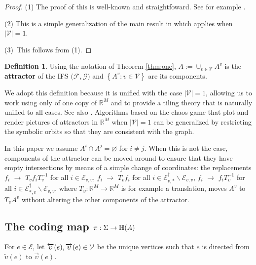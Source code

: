 \documentclass{amsproc}
\theoremstyle{plain}
\theoremstyle{definition}
\newtheorem{definition}{Definition}
\numberwithin{equation}{section}
\begin{document}
\begin{proof}
(1) The proof of this is well-known and straightfoward. See for example \cite%
[Chapter 10]{barnsleyFE2}.

(2) This is a simple generalization of the main result in \cite%
{barnsleychaos} which applies when $\left\vert \mathcal{V}\right\vert =1$.

(3)\ This follows from (1).
\end{proof}

\begin{definition}
Using the notation of Theorem \ref{thm:one}, $A:=\cup_{v\in\mathcal{V}}A^{v}$
is the \textbf{attractor} of the IFS $\mathcal{(F},\mathcal{G)}$ and $%
\left\{ A^{v}:v\in\mathcal{V}\right\} $ are its components.
\end{definition}

We adopt this definition because it is unified with the case $\left\vert 
\mathcal{V}\right\vert =1$, allowing us to work using only of one copy of $%
\mathbb{R}^{M}$ and to provide a tiling theory that is naturally unified to
all cases. See also \cite{bandt2}. Algorithms based on the chaos game that
plot and render pictures of attractors in $\mathbb{R}^{M}$ when $\left\vert 
\mathcal{V}\right\vert =1$ can be generalized by restricting the symbolic
orbits so that they are consistent with the graph.

In this paper we assume $A^{i}\cap A^{j}=\varnothing$ for $i\neq j$. When
this is not the case, components of the attractor can be moved around to
ensure that they have empty intersections by means of a simple change of
coordinates: the replacements $f_{i}$ $\rightarrow$ $T_{v}f_{i}T_{v}^{-1}$
for all $i\in\mathcal{E}_{v,v}$, $f_{i}$ $\rightarrow$ $T_{v}f_{i}$ for all $%
i\in\mathcal{E}_{v,\ast}^{\dag}\backslash\mathcal{E}_{v,v}$, $f_{i}$ $%
\rightarrow$ $f_{i}T_{\upsilon}^{-1}$ for all $i\in\mathcal{E}%
_{\ast,v}^{\dag}\backslash\mathcal{E}_{v,v}$, where $T_{\upsilon}:\mathbb{R}%
^{M}\rightarrow\mathbb{R}^{M}$ is for example a translation, moves $A^{v}$
to $T_{\upsilon}A^{v}$ without altering the other components of the
attractor.

\subsection{The coding map $\protect\pi:\Sigma\rightarrow\mathbb{H(}A)$}

For $e\in\mathcal{E}$, let $\overleftarrow{\upsilon}(e),\overrightarrow{%
\upsilon}(e)\in\mathcal{V}$ be the unique vertices such that $e$ is directed
from $\overleftarrow{\upsilon}(e)$ to $\overrightarrow{\upsilon}(e)$.
\end{document}
